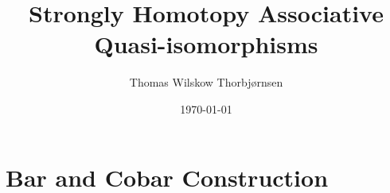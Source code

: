 \documentclass[american,titlepage]{ntnuthesis}
\title{Strongly Homotopy Associative Quasi-isomorphisms}
\author{Thomas Wilskow Thorbjørnsen}
\date{\today}
\theoremstyle{plain}
\theoremstyle{definition}
\theoremstyle{remark}
\begin{document}
    

    \tableofcontents %

    \printglossary[type=\acronymtype] %
    \printglossary                    %

    \chapter{Bar and Cobar Construction}

        

    \chapter*{\bibname}
    \printbibliography[heading=none]



    \appendix
% 
\end{document}
